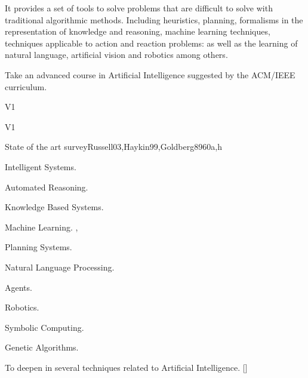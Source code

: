 \begin{syllabus}


\begin{justification}
  It provides a set of tools to solve problems that are difficult to solve with traditional algorithmic methods. Including heuristics, planning, formalisms in the representation of knowledge and reasoning, machine learning techniques, techniques applicable to action and reaction problems: as well as the learning of natural language, artificial vision and robotics among others. 
\end{justification}

\begin{goals}
\item Take an advanced course in Artificial Intelligence suggested by the ACM/IEEE curriculum.
\end{goals}

\begin{outcomes}{V1}
\item {}
\item {}
\item {}
\item {}
\end{outcomes}

\begin{competences}{V1}
\item {} 
\item {} 
\item {}
\end{competences}

\begin{unit}{}{State of the art survey}{Russell03,Haykin99,Goldberg89}{60}{a,h}
\begin{topics}
  \item Intelligent Systems.
  \item Automated Reasoning.
  \item Knowledge Based Systems.
  \item Machine Learning. \cite{Russell03},\cite{Haykin99}
  \item Planning Systems.
  \item Natural Language Processing.
  \item Agents.
  \item Robotics.
  \item Symbolic Computing.
  \item Genetic Algorithms. \cite{Goldberg89}
\end{topics}
\begin{learningoutcomes}
  \item To deepen in several techniques related to Artificial Intelligence. [\Usage]
\end{learningoutcomes}
\end{unit}

\begin{coursebibliography}
\end{coursebibliography}

\end{syllabus}
